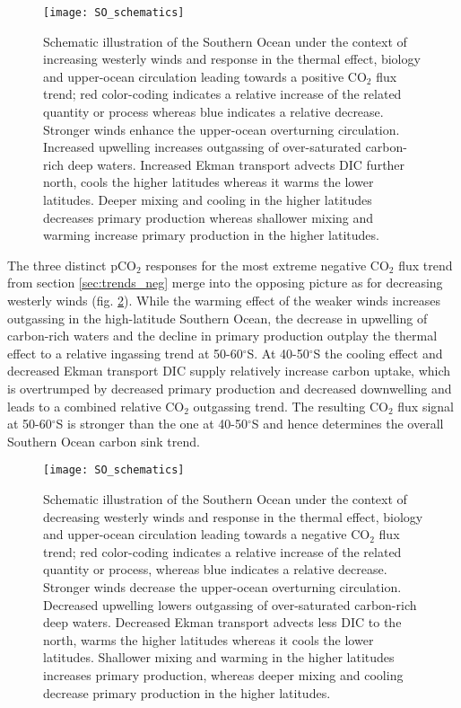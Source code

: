 \begin{figure}[h!]
	\centering
	\texttt{[image: SO\_schematics]}
	\caption{Schematic illustration of the Southern Ocean under the context of increasing westerly winds and response in the thermal effect, biology and upper-ocean circulation leading towards a positive CO$_2$ flux trend; red color-coding indicates a relative increase of the related quantity or process whereas blue indicates a relative decrease. Stronger winds enhance the upper-ocean overturning circulation. Increased upwelling increases outgassing of over-saturated carbon-rich deep waters. Increased Ekman transport advects DIC further north, cools the higher latitudes whereas it warms the lower latitudes. Deeper mixing and cooling in the higher latitudes decreases primary production whereas shallower mixing and warming increase primary production in the higher latitudes.}
	\label{fig:schematics_pos}
\end{figure}



\clearpage
\label{sec:pCO2separation_neg}
The three distinct pCO$_2$ responses for the most extreme negative CO$_2$ flux trend from section \ref{sec:trends_neg} merge into the opposing picture as for decreasing westerly winds (fig. \ref{fig:schematics_neg}). 
While the warming effect of the weaker winds increases outgassing in the high-latitude Southern Ocean, the decrease in upwelling of carbon-rich waters and the decline in primary production outplay the thermal effect to a relative ingassing trend at 50-60$^\circ$S. At 40-50$^\circ$S the cooling effect and decreased Ekman transport DIC supply relatively increase carbon uptake, which is overtrumped by decreased primary production and decreased downwelling and leads to a combined relative CO$_2$ outgassing trend. The resulting CO$_2$ flux signal at 50-60$^\circ$S is stronger than the one at 40-50$^\circ$S and hence determines the overall Southern Ocean carbon sink trend.


\begin{figure}[h!]
	\centering
	\texttt{[image: SO\_schematics]}
	\caption{Schematic illustration of the Southern Ocean under the context of decreasing westerly winds and response in the thermal effect, biology and upper-ocean circulation leading towards a negative CO$_2$ flux trend; red color-coding indicates a relative increase of the related quantity or process, whereas blue indicates a relative decrease. Stronger winds decrease the upper-ocean overturning circulation. Decreased upwelling lowers outgassing of over-saturated carbon-rich deep waters. Decreased Ekman transport advects less DIC to the north, warms the higher latitudes whereas it cools the lower latitudes. Shallower mixing and warming in the higher latitudes increases primary production, whereas deeper mixing and cooling decrease primary production in the higher latitudes.}
	\label{fig:schematics_neg}
\end{figure}
